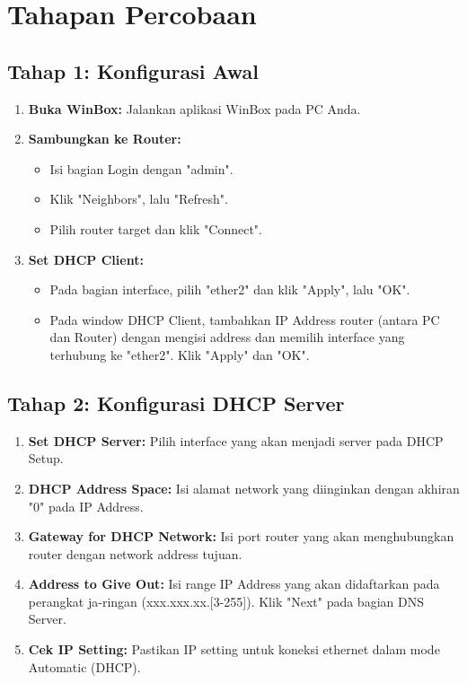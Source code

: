 \section*{Tahapan Percobaan} %

\subsection*{Tahap 1: Konfigurasi Awal}

\begin{enumerate}
    \item \textbf{Buka WinBox:} Jalankan aplikasi WinBox pada PC Anda.
    \item \textbf{Sambungkan ke Router:}
    \begin{itemize}
        \item Isi bagian Login dengan "admin".
        \item Klik "Neighbors", lalu "Refresh".
        \item Pilih router target dan klik "Connect".
    \end{itemize}
    \item \textbf{Set DHCP Client:}
    \begin{itemize}
        \item Pada bagian interface, pilih "ether2" dan klik "Apply", lalu "OK".
        \item Pada window DHCP Client, tambahkan IP Address router (antara PC dan Router) dengan mengisi address dan memilih interface yang terhubung ke "ether2". Klik "Apply" dan "OK".
    \end{itemize}
\end{enumerate}

\subsection*{Tahap 2: Konfigurasi DHCP Server}

\begin{enumerate}
    \item \textbf{Set DHCP Server:} Pilih interface yang akan menjadi server pada DHCP Setup.
    \item \textbf{DHCP Address Space:} Isi alamat network yang diinginkan dengan akhiran "0" pada IP Address.
    \item \textbf{Gateway for DHCP Network:} Isi port router yang akan menghubungkan router dengan network address tujuan.
    \item \textbf{Address to Give Out:} Isi range IP Address yang akan didaftarkan pada perangkat ja-ringan (xxx.xxx.xx.[3-255]). Klik "Next" pada bagian DNS Server.
    \item \textbf{Cek IP Setting:} Pastikan IP setting untuk koneksi ethernet dalam mode Automatic (DHCP).
\end{enumerate}

